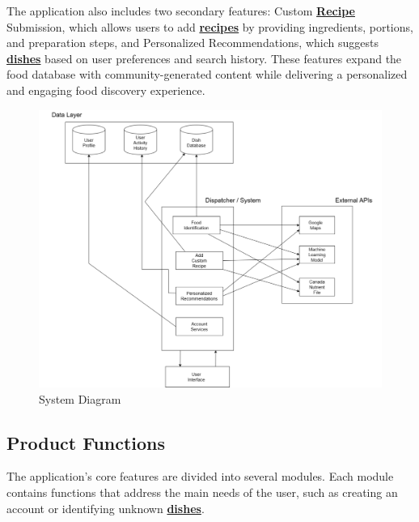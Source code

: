 \documentclass[]{article}
\begin{document}
The application also includes two secondary features: Custom \hyperref[Recipe]{\textbf{Recipe}} Submission, which allows users to add \hyperref[Recipe]{\textbf{recipes}} by providing ingredients, portions, and preparation steps, and Personalized Recommendations, which suggests \hyperref[Dish]{\textbf{dishes}} based on user preferences and search history. These features expand the food database with community-generated content while delivering a personalized and engaging food discovery experience.


\begin{figure}[H]
    \centering
    \includegraphics[width=\textwidth]{image/2.1_Diagram.pdf}
    \caption{System Diagram}
\end{figure}

\subsection{Product Functions}
\label{sub:product_functions}

The application's core features are divided into several modules. Each module contains functions that address the main needs of the user, such as creating an account or identifying unknown \hyperref[Dish]{\textbf{dishes}}.
\end{document}
